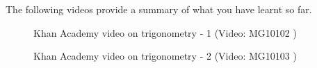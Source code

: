 The following videos provide a summary of what you have learnt so far.
\setcounter{subfigure}{0}
\begin{figure}[H] %
\textnormal{Khan Academy video on trigonometry - 1}\vspace{.1in} \nopagebreak
\label{m39408*yt-media}\label{m39408*yt-video}
 { (Video:  MG10102 )}
\vspace{2pt}
\vspace{.1in}
\end{figure}       \par \label{m39408*eip-33}
\setcounter{subfigure}{0}
\begin{figure}[H] %
\textnormal{Khan Academy video on trigonometry - 2}\vspace{.1in} \nopagebreak
\label{m39408*yt-media2}\label{m39408*yt-video2}
 { (Video:  MG10103 )}
\vspace{2pt}
\vspace{.1in}
\end{figure}       


